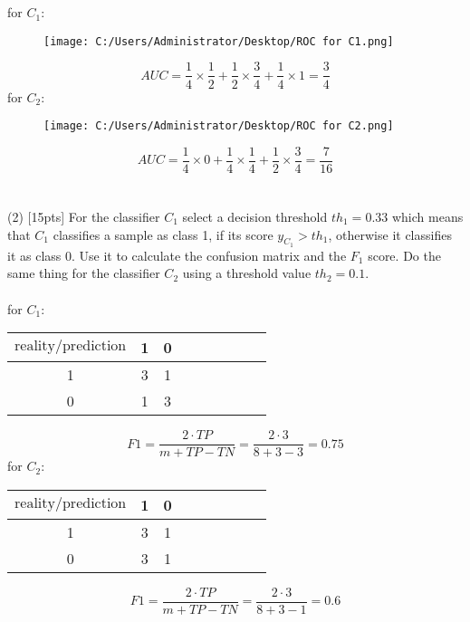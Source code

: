 \documentclass{article}
\begin{document}
\\\\
for $C_1$:\\
\begin{figure}
    \centering
    \texttt{[image: C:/Users/Administrator/Desktop/ROC for C1.png]}
\end{figure}
\begin{equation}
    AUC=\frac{1}{4} \times \frac{1}{2} + \frac{1}{2} \times \frac{3}{4} + \frac{1}{4} \times 1=\frac{3}{4}
\end{equation}
for $C_2$:\\
\begin{figure}
    \centering
    \texttt{[image: C:/Users/Administrator/Desktop/ROC for C2.png]}
\end{figure}
\begin{equation}
    AUC=\frac{1}{4} \times 0 + \frac{1}{4} \times \frac{1}{4} + \frac{1}{2} \times \frac{3}{4}=\frac{7}{16}
\end{equation}
\\\\
(2) [15pts] For the classifier $C_1$ select a decision threshold $th_1 = 0.33$ which means that $C_1$ classifies a sample as class 1, if its score $y_{C_1} > th_1$, otherwise it classifies it as class 0. Use it to calculate the confusion matrix and the $F_1$ score. Do the same thing for the classifier $C_2$ using a threshold value $th_2 = 0.1$.\\\\
for $C_1$:\\
\begin{table}[htbp]
    \centering
    \begin{tabular}{c|cccccccc}
        \hline
        $\text{reality}/\text{prediction}$ & 1 & 0\\
        \hline
        1 & 3 & 1\\
        \hline
        0 & 1 & 3\\
        \hline
    \end{tabular}
\end{table}
\begin{equation}
    F1=\frac{2 \cdot TP}{m+TP-TN}=\frac{2 \cdot 3}{8+3-3}=0.75
\end{equation}
for $C_2$:\\
\begin{table}[htbp]
    \centering
    \begin{tabular}{c|cccccccc}
        \hline
        $\text{reality}/\text{prediction}$ & 1 & 0\\
        \hline
        1 & 3 & 1\\
        \hline
        0 & 3 & 1\\
        \hline
    \end{tabular}
\end{table}
\begin{equation}
    F1=\frac{2 \cdot TP}{m+TP-TN}=\frac{2 \cdot 3}{8+3-1}=0.6
\end{equation}
\end{document}

